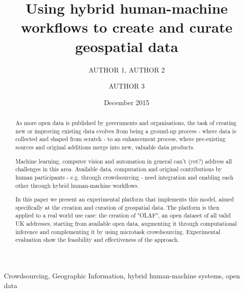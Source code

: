 \documentclass{llncs}
\title{Using hybrid human-machine workflows to create and curate geospatial data}
\author{AUTHOR 1\inst{1}, AUTHOR 2\inst{1} \and AUTHOR 3\inst{2}}
\institute{INSTITUTE 1 \email{EMAIL FOR AUTHOR 1} \and INSTITUTE 2}
\date{December 2015}
\begin{document}
\maketitle

\begin{abstract}
As more open data is published by governments and organisations, the task of creating new or improving existing data evolves from being a ground-up process - where data is collected and shaped from scratch - to an enhancement process, where pre-existing sources and original additions merge into new, valuable data products. 

Machine learning, computer vision and automation in general can't (yet?) address all challenges in this area. Available data, computation and original contributions by human participants - e.g. through crowdsourcing - need integration and enabling each other through hybrid human-machine workflows. 

In this paper we present an experimental platform that implements this model, aimed specifically at the creation and curation of geospatial data. The platform is then applied to a real world use case: the creation of "OLAF", an open dataset of all valid UK addresses, starting from available open data, augmenting it through computational inference and complementing it by using microtask crowdsourcing. Experimental evaluation show the feasibility and effectiveness of the approach.
\end{abstract}

\begin{keywords}
Crowdsourcing, Geographic Information, hybrid human-machine systems, open data 
\end{keywords}
\end{document}
